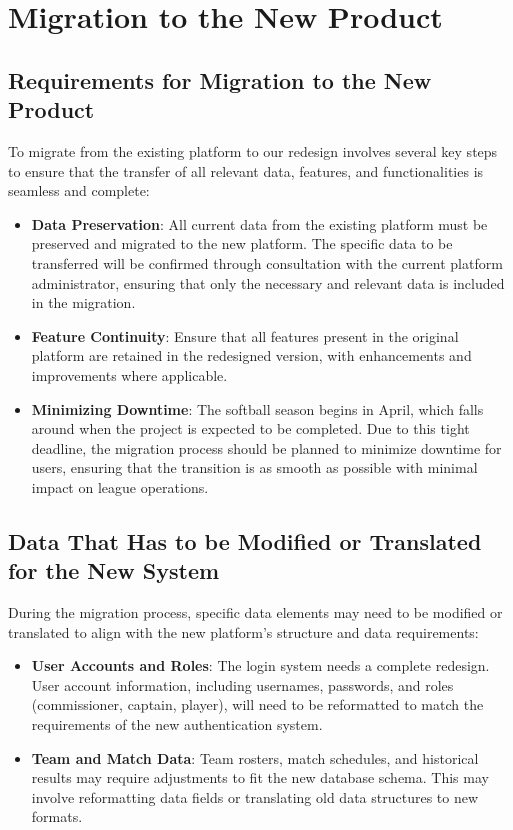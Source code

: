 \documentclass[12pt]{article}
\begin{document}
\section{Migration to the New Product}
\subsection{Requirements for Migration to the New Product}
To migrate from the existing platform to our redesign involves several key steps to ensure that the transfer of all relevant data, features, and functionalities is seamless and complete:

\begin{itemize}
    \item \textbf{Data Preservation}: All current data from the existing platform must be preserved and migrated to the new platform. The specific data to be transferred will be confirmed through consultation with the current platform administrator, ensuring that only the necessary and relevant data is included in the migration.
    \item \textbf{Feature Continuity}: Ensure that all features present in the original platform are retained in the redesigned version, with enhancements and improvements where applicable.
    \item \textbf{Minimizing Downtime}: The softball season begins in April, which falls around when the project is expected to be completed. Due to this tight deadline, the migration process should be planned to minimize downtime for users, ensuring that the transition is as smooth as possible with minimal impact on league operations.
\end{itemize}

\subsection{Data That Has to be Modified or Translated for the New System}
During the migration process, specific data elements may need to be modified or translated to align with the new platform's structure and data requirements:

\begin{itemize}
    \item \textbf{User Accounts and Roles}: The login system needs a complete redesign. User account information, including usernames, passwords, and roles (commissioner, captain, player), will need to be reformatted to match the requirements of the new authentication system.
    \item \textbf{Team and Match Data}: Team rosters, match schedules, and historical results may require adjustments to fit the new database schema. This may involve reformatting data fields or translating old data structures to new formats.
\end{itemize}
\end{document}

